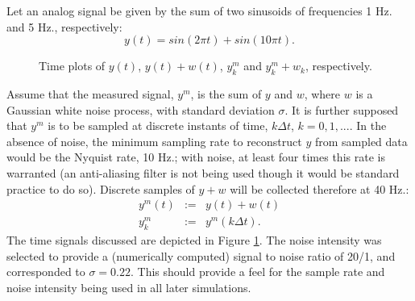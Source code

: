 
Let an analog signal be given by the sum of two sinusoids of frequencies 1 Hz. and
5 Hz., respectively:
\begin{equation}
y(t) = sin(2 \pi t) + sin(10 \pi t).
\label{sines}
\end{equation}



\begin{figure}[hbt]
\centerline{}
\smallskip
\small
\caption{Time plots of $y(t)$, $y(t) + w(t)$, $y^m_k$ and $y^m_k + w_k$, respectively.}
\label{signals}
\end{figure}


Assume that the measured signal, $y^m$, is the sum of $y$ and $w$, where $w$ is a
Gaussian white noise process, with standard deviation $\sigma$.  
It is further supposed that
$y^m$ is to be sampled at discrete instants of time,
$k \Delta t$, $k = 0, 1, ...$.  In the absence of noise, the minimum sampling rate 
to reconstruct $y$ from sampled data would be the Nyquist rate, 10 Hz.; with
noise,
at least four times this rate is warranted (an anti-aliasing filter is not
being used
though it would be standard practice to do so).
Discrete samples of $y + w$ will be collected therefore
at 40 Hz.:
\begin{eqnarray}
y^m(t) &:=& y(t) + w(t) \\
y^m_k & :=& y^m(k \Delta t). \nonumber
\label{ysampled}
\end{eqnarray}
The time signals discussed are depicted in Figure \ref{signals}.  The noise
intensity was selected to provide a (numerically computed)
signal to noise ratio of 20/1, and
corresponded to $\sigma = 0.22$. This should 
provide a feel for the sample rate and noise intensity being used in all later
simulations.


